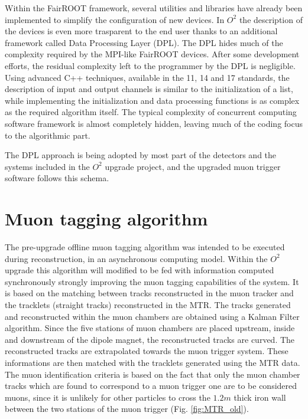 Within the FairROOT framework, several utilities and libraries have already been implemented to simplify the configuration of new devices.
In $O^2$ the description of the devices is even more trasparent to the end user thanks to an additional framework called Data Processing Layer (DPL).
The DPL hides much of the complexity required by the MPI-like FairROOT devices.
After some development efforts, the residual complexity left to the programmer by the DPL is negligible.
Using advanced C++ techniques, available in the 11, 14 and 17 standards, the description of input and output channels is similar to the initialization of a list, while implementing the initialization and data processing functions is as complex as the required algorithm itself.
The typical complexity of concurrent computing software framework is almost completely hidden, leaving much of the coding focus to the algorithmic part.

The DPL approach is being adopted by most part of the detectors and the systems included in the $O^2$ upgrade project, and the upgraded muon trigger software follows this schema.

\section{Muon tagging algorithm}
\label{MTR_tagging}
The pre-upgrade offline muon tagging algorithm was intended to be executed during reconstruction, in an asynchronous computing model.
Within the $O^2$ upgrade this algorithm will modified to be fed with information computed synchronously strongly improving the muon tagging capabilities of the system.
It is based on the matching between tracks reconstructed in the muon tracker and the tracklets (straight tracks) reconstructed in the MTR.
The tracks generated and reconstructed within the muon chambers are obtained using a Kalman Filter algorithm.
Since the five stations of muon chambers are placed upstream, inside and downstream of the dipole magnet, the reconstructed tracks are curved.
The reconstructed tracks are extrapolated towards the muon trigger system.
These informations are then matched with the tracklets generated using the MTR data.
The muon identification criteria is based on the fact that only the muon chamber tracks which are found to correspond to a muon trigger one are to be considered muons, since it is unlikely for other particles to cross the $1.2m$ thick iron wall between the two stations of the muon trigger (Fig. \ref{fig:MTR_old}).

